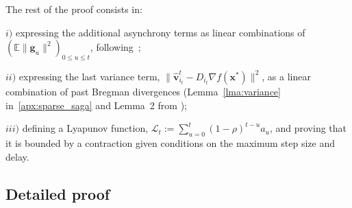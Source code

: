 \documentclass{article}
\def\EE{{\mathbb E}}
\def\xx{{\boldsymbol x}}
\def\vv{{\boldsymbol v}}
\begin{document}
The rest of the proof consists in:

$i)$ expressing the additional asynchrony terms as linear combinations of $(\EE \|\boldsymbol g_u\|^2)_{0 \leq u \leq t}$, following~\citet[Lemma 1]{leblond2016Asaga};


$ii)$ expressing the last variance term, $\|\hat \vv^t_{i_t} - D_{i_t} \nabla f(\xx^*)\|^2$, as a linear combination of past Bregman divergences (Lemma~\ref{lma:variance} in~\ref{apx:sparse_saga} and Lemma~2 from \citet{leblond2016Asaga});

$iii)$ defining a Lyapunov function, $\mathcal{L}_t := {\sum_{u=0}^t (1 - \rho)^{t-u} a_u}$, and proving that it is bounded by a contraction given conditions on the maximum step size and delay.


\vspace{0.5em}

\subsection{Detailed proof}
\end{document}
